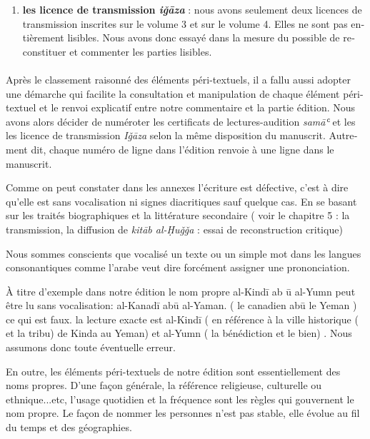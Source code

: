 \documentclass[a4paper,12pt]{report}
\begin{document}
\begin{itemize}
\begin{enumerate}
\begin{french}
\begin{enumerate}
\begin{enumerate}
\end{enumerate}

\item \textbf{les licence de transmission \textit{iǧāza }} : nous avons seulement deux licences de transmission inscrites sur le volume 3 et sur le volume 4. Elles ne sont pas entièrement lisibles. Nous avons donc essayé dans la mesure du possible de reconstituer et commenter les parties lisibles.    
\end{enumerate}

\paragraph{}
Après le classement raisonné  des éléments péri-textuels, il a fallu aussi adopter une démarche qui facilite la consultation et  manipulation de chaque élément péri-textuel et le renvoi explicatif entre notre commentaire et la partie édition. Nous avons alors décider de numéroter les certificats de lectures-audition \textit{samāʿ}
et les les licence de transmission \textit{Iǧāza } selon la même disposition du manuscrit. Autrement dit, chaque  numéro de ligne dans l'édition  renvoie  à une ligne  dans le manuscrit.

Comme on peut constater dans les annexes l'écriture est  défective,  c'est à dire qu'elle est sans vocalisation ni signes diacritiques sauf quelque  cas. En se basant sur les traités biographiques et la littérature secondaire ( voir le chapitre 5 : la transmission, la diffusion de \textit{kitāb al-Ḥuǧǧa  } : essai de reconstruction critique) 

Nous sommes conscients que vocalisé un texte ou  un simple  mot  dans les langues consonantiques  comme l’arabe veut dire forcément  assigner une  prononciation.   

À titre d’exemple dans notre édition le nom propre  al-Kindī ab \=u al-Yumn peut être lu sans vocalisation: al-Kanadī ab\=u  al-Yaman. ( le canadien ab\=u le Yeman ) ce qui est faux. la lecture exacte est  al-Kindī  ( en référence à la ville historique ( et la tribu)  de Kinda au Yeman) et al-Yumn ( la bénédiction et le bien) . Nous assumons donc toute éventuelle erreur.    

En outre, les éléments péri-textuels  de notre édition sont essentiellement des noms propres. D'une façon générale, la référence religieuse, culturelle ou ethnique...etc, l'usage quotidien et la fréquence  sont les règles qui gouvernent le nom propre. Le façon de nommer les personnes n'est pas stable, elle évolue au fil du temps et des géographies. 


\end{french}
\end{enumerate}
\end{itemize}
\end{document}
